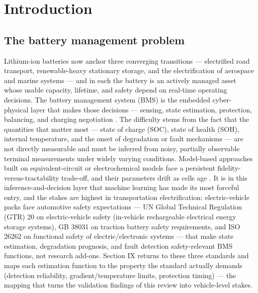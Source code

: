 \documentclass[journal]{IEEEtran}
\begin{document}
\section{Introduction}

\subsection{The battery management problem}

Lithium-ion batteries now anchor three converging transitions --- electrified road transport, renewable-heavy stationary storage, and the electrification of aerospace and marine systems --- and in each the battery is an actively managed asset whose usable capacity, lifetime, and safety depend on real-time operating decisions. The battery management system (BMS) is the embedded cyber-physical layer that makes those decisions --- sensing, state estimation, protection, balancing, and charging negotiation \cite{r1}. The difficulty stems from the fact that the quantities that matter most --- state of charge (SOC), state of health (SOH), internal temperature, and the onset of degradation or fault mechanisms --- are not directly measurable and must be inferred from noisy, partially observable terminal measurements under widely varying conditions. Model-based approaches built on equivalent-circuit or electrochemical models face a persistent fidelity-versus-tractability trade-off, and their parameters drift as cells age \cite{r2}. It is in this inference-and-decision layer that machine learning has made its most forceful entry, and the stakes are highest in transportation electrification: electric-vehicle packs face automotive safety expectations --- UN Global Technical Regulation (GTR) 20 on electric-vehicle safety (in-vehicle rechargeable electrical energy storage systems), GB 38031 on traction battery safety requirements, and ISO 26262 on functional safety of electric/electronic systems --- that make state estimation, degradation prognosis, and fault detection safety-relevant BMS functions, not research add-ons. Section IX returns to these three standards and maps each estimation function to the property the standard actually demands (detection reliability, gradient/temperature limits, protection timing) --- the mapping that turns the validation findings of this review into vehicle-level stakes.
\end{document}
